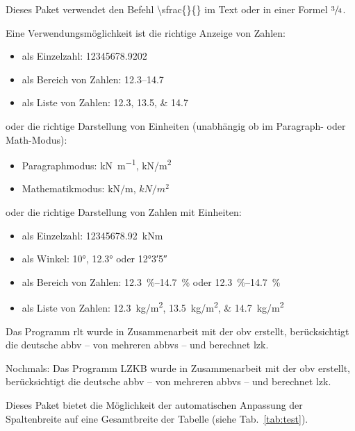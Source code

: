 %
Dieses Paket verwendet den Befehl \textbackslash{}sfrac\{\}\{\} im Text
 oder in einer Formel $\sfrac{3}{4}$.

Eine Verwendungsmöglichkeit ist die richtige Anzeige von Zahlen:
%
\begin{itemize} 
  \item als Einzelzahl: \num{12345678,9202}
  \item als Bereich von Zahlen: \numrange{12,3}{14,7} 
  \item als Liste von Zahlen: 
                      \numlist[list-final-separator={ und }]{12,3;13,5;14,7}
\end{itemize}
%
oder die richtige Darstellung von Einheiten (unabhängig ob im Paragraph- oder Math-Modus):
%
\begin{itemize} 
  \item Paragraphmodus: \si{\kilo\newton\per\meter}, \si{kN/m^2}
  \item Mathematikmodus:  $\si{\kilo\newton\per\meter}$, $\si{kN/m^2}$
\end{itemize}
%
oder die richtige Darstellung von Zahlen mit Einheiten:
%
\begin{itemize} 
  \item als Einzelzahl: \SI{12345678,92}{kNm}
  \item als Winkel: \ang{10}, \ang{12.3} oder \ang{12;3;5}
  \item als Bereich von Zahlen: \SIrange{12,3}{14,7}{\%} oder 
          \SIrange[range-units = single]{12,3}{14,7}{\%}
  \item als Liste von Zahlen: 
        \SIlist[list-final-separator={ und }]{12,3;13,5;14,7}{\kilogram/m^2}
\end{itemize}
%


Das Programm \ac{rlt} wurde in Zusammenarbeit mit der \ac{obv} erstellt, berücksichtigt die deutsche \ac{abbv} -- von mehreren \aclp{abbv} -- und berechnet \ac{lzk}.

Nochmals:
Das Programm LZKB wurde in Zusammenarbeit mit der \ac{obv} erstellt, berücksichtigt die deutsche \ac{abbv} -- von mehreren \acp{abbv} -- und berechnet \ac{lzk}.

Dieses Paket bietet die Möglichkeit der automatischen Anpassung der Spaltenbreite auf eine Gesamtbreite der Tabelle (siehe Tab.~\ref{tab:test}).


